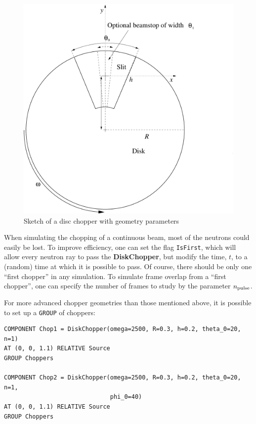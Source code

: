 \begin{figure}[ht]
\centering
\includegraphics[width=0.8\linewidth]{figures/DiskChopper}
\caption{Sketch of a disc chopper with geometry parameters}
\label{f:chopper1}
\end{figure}


%

When simulating the chopping of a continuous beam,
most of the neutrons could easily be lost.
To improve efficiency, one can set the flag \verb+IsFirst+, which will
allow every neutron ray to pass the {\bf DiskChopper}, but modify the
time, $t$, to a (random) time at which it is possible to pass.
Of course, there should be only one ``first chopper'' in
any simulation.
To simulate frame overlap from a ``first chopper'', one can specify
the number of frames to study by the parameter $n_{\rm pulse}$.

For more advanced chopper geometries than those mentioned above, it is
possible to set up a \texttt{GROUP} of choppers:

\begin{lstlisting}
COMPONENT Chop1 = DiskChopper(omega=2500, R=0.3, h=0.2, theta_0=20, n=1)
AT (0, 0, 1.1) RELATIVE Source
GROUP Choppers

COMPONENT Chop2 = DiskChopper(omega=2500, R=0.3, h=0.2, theta_0=20, n=1,
                              phi_0=40)
AT (0, 0, 1.1) RELATIVE Source
GROUP Choppers
\end{lstlisting}


